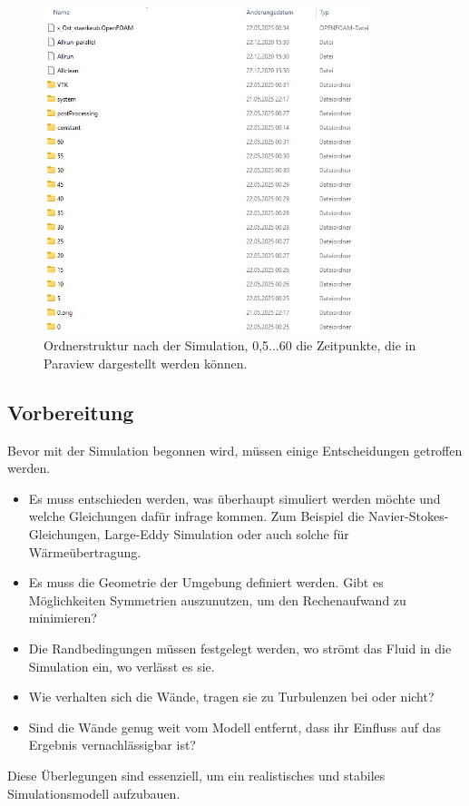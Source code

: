 \begin{figure}
    \centering
    \includegraphics[width=0.85\textwidth]{papers/openfoam/Bilder/Ordnerstruktur_Simuliert.jpg}
    \caption{Ordnerstruktur nach der Simulation, 0,5...60 die Zeitpunkte, die in Paraview dargestellt werden können.}
    \label{fig:ordStrktSim}
\end{figure}

\subsection{Vorbereitung \label{openfoam:section:Vorbereitung}}
Bevor mit der Simulation begonnen wird, müssen einige Entscheidungen getroffen werden.
\begin{itemize}
    \item Es muss entschieden werden, was überhaupt simuliert werden möchte und welche Gleichungen dafür infrage kommen.
    Zum Beispiel die Navier-Stokes-Gleichungen, Large-Eddy Simulation oder auch solche für Wärmeübertragung.
    \item Es muss die Geometrie der Umgebung definiert werden. 
    Gibt es Möglichkeiten Symmetrien auszunutzen, um den Rechenaufwand zu minimieren?
    \item Die Randbedingungen müssen festgelegt werden, wo strömt das Fluid in die Simulation ein, wo verlässt es sie.
    \item Wie verhalten sich die Wände, tragen sie zu Turbulenzen bei oder nicht?
%
    \item Sind die Wände genug weit vom Modell entfernt, dass ihr Einfluss auf das Ergebnis vernachlässigbar ist?
\end{itemize} 
Diese Überlegungen sind essenziell, um ein realistisches und stabiles Simulationsmodell aufzubauen.

